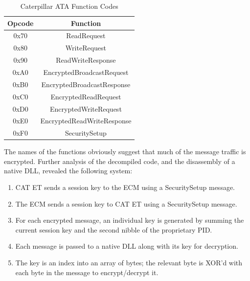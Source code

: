 \begin{table}[h]
  \centering
   \begin{tabular}{|c|c|}
    \hline
    Opcode & Function \\
    \hline
    0x70 & ReadRequest \\
    \hline
    0x80 & WriteRequest \\
    \hline
    0x90 & ReadWriteResponse\\
    \hline
    0xA0 & EncryptedBroadcastRequest\\
    \hline
    0xB0 & EncryptedBroadcastResponse\\
    \hline
    0xC0 & EncryptedReadRequest\\
    \hline
    0xD0 & EncryptedWriteRequest\\
    \hline
    0xE0 & EncryptedReadWriteResponse\\
    \hline
    0xF0 & SecuritySetup\\
    \hline
   \end{tabular}

\caption{Caterpillar ATA Function Codes}
\label{tab:catet}
\end{table}

The names of the functions obviously suggest that much of the message traffic is encrypted. Further analysis of the
decompiled code, and the disassembly of a native DLL,  revealed the following system:

\begin{enumerate}
  \item CAT ET sends a session key to the ECM using a SecuritySetup message.
  \item The ECM sends a session key to CAT ET using a SecuritySetup message.
  \item For each encrypted message, an individual key is generated by summing the
        current session key and the second nibble of the proprietary PID.
  \item Each message is passed to a native DLL along with its key for decryption.
  \item The key is an index into an array of bytes; the relevant byte is XOR'd
        with each byte in the message to encrypt/decrypt it.
\end{enumerate}


